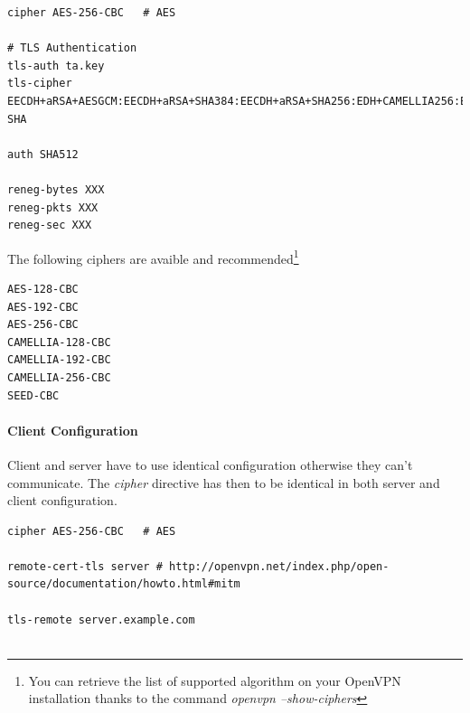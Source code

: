 \begin{description}

\item[Settings:] \mbox{}



\begin{lstlisting}[breaklines]
cipher AES-256-CBC   # AES

# TLS Authentication
tls-auth ta.key
tls-cipher EECDH+aRSA+AESGCM:EECDH+aRSA+SHA384:EECDH+aRSA+SHA256:EDH+CAMELLIA256:EECDH:EDH+aRSA:+SSLv3:!aNULL:!eNULL:!LOW:!3DES:!MD5:!EXP:!PSK:!SRP:!DSS:!RC4:!SEED:!AES128:!CAMELLIA128:!ECDSA:AES256-SHA

auth SHA512

reneg-bytes XXX
reneg-pkts XXX
reneg-sec XXX

\end{lstlisting}



The following ciphers are avaible and recommended\footnote{You can retrieve the list of supported algorithm on your OpenVPN installation thanks to the command {\it openvpn --show-ciphers}}
\begin{lstlisting}[breaklines]
AES-128-CBC
AES-192-CBC
AES-256-CBC
CAMELLIA-128-CBC
CAMELLIA-192-CBC
CAMELLIA-256-CBC
SEED-CBC
\end{lstlisting}


\paragraph{Client Configuration}

Client and server have to use identical configuration otherwise they can't communicate.
The {\it cipher} directive has then to be identical in both server and client configuration.

\begin{lstlisting}[breaklines]
cipher AES-256-CBC   # AES

remote-cert-tls server # http://openvpn.net/index.php/open-source/documentation/howto.html#mitm

tls-remote server.example.com


\end{lstlisting}
\end{description}
